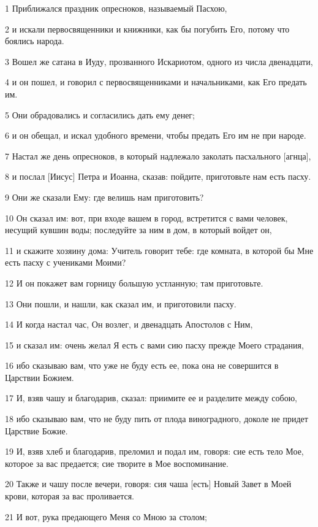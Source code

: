 \par 1 Приближался праздник опресноков, называемый Пасхою,
\par 2 и искали первосвященники и книжники, как бы погубить Его, потому что боялись народа.
\par 3 Вошел же сатана в Иуду, прозванного Искариотом, одного из числа двенадцати,
\par 4 и он пошел, и говорил с первосвященниками и начальниками, как Его предать им.
\par 5 Они обрадовались и согласились дать ему денег;
\par 6 и он обещал, и искал удобного времени, чтобы предать Его им не при народе.
\par 7 Настал же день опресноков, в который надлежало заколать пасхального [агнца],
\par 8 и послал [Иисус] Петра и Иоанна, сказав: пойдите, приготовьте нам есть пасху.
\par 9 Они же сказали Ему: где велишь нам приготовить?
\par 10 Он сказал им: вот, при входе вашем в город, встретится с вами человек, несущий кувшин воды; последуйте за ним в дом, в который войдет он,
\par 11 и скажите хозяину дома: Учитель говорит тебе: где комната, в которой бы Мне есть пасху с учениками Моими?
\par 12 И он покажет вам горницу большую устланную; там приготовьте.
\par 13 Они пошли, и нашли, как сказал им, и приготовили пасху.
\par 14 И когда настал час, Он возлег, и двенадцать Апостолов с Ним,
\par 15 и сказал им: очень желал Я есть с вами сию пасху прежде Моего страдания,
\par 16 ибо сказываю вам, что уже не буду есть ее, пока она не совершится в Царствии Божием.
\par 17 И, взяв чашу и благодарив, сказал: приимите ее и разделите между собою,
\par 18 ибо сказываю вам, что не буду пить от плода виноградного, доколе не придет Царствие Божие.
\par 19 И, взяв хлеб и благодарив, преломил и подал им, говоря: сие есть тело Мое, которое за вас предается; сие творите в Мое воспоминание.
\par 20 Также и чашу после вечери, говоря: сия чаша [есть] Новый Завет в Моей крови, которая за вас проливается.
\par 21 И вот, рука предающего Меня со Мною за столом;
